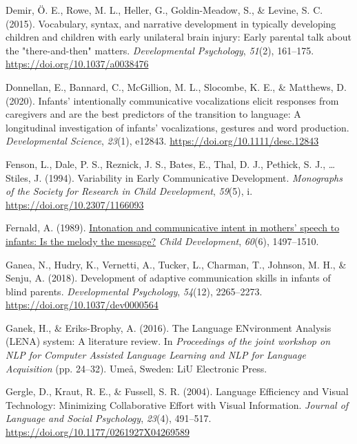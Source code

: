 \documentclass[
  man,floatsintext]{apa6}
\newlength{\cslhangindent}
\newlength{\cslentryspacingunit} %
\newenvironment{CSLReferences}[2] %
 {%
  \setlength{\parindent}{0pt}
  \ifodd #1
  \let\oldpar\par
  \def\par{\hangindent=\cslhangindent\oldpar}
  \fi
  \setlength{\parskip}{#2\cslentryspacingunit}
 }%
 {}
\begin{document}
\begin{CSLReferences}{1}{0}
\leavevmode{}%
Demir, Ö. E., Rowe, M. L., Heller, G., Goldin-Meadow, S., \& Levine, S. C. (2015). Vocabulary, syntax, and narrative development in typically developing children and children with early unilateral brain injury: Early parental talk about the "there-and-then" matters. \emph{Developmental Psychology}, \emph{51}(2), 161--175. \url{https://doi.org/10.1037/a0038476}

\leavevmode{}%
Donnellan, E., Bannard, C., McGillion, M. L., Slocombe, K. E., \& Matthews, D. (2020). Infants' intentionally communicative vocalizations elicit responses from caregivers and are the best predictors of the transition to language: {A} longitudinal investigation of infants' vocalizations, gestures and word production. \emph{Developmental Science}, \emph{23}(1), e12843. \url{https://doi.org/10.1111/desc.12843}

\leavevmode{}%
Fenson, L., Dale, P. S., Reznick, J. S., Bates, E., Thal, D. J., Pethick, S. J., \ldots{} Stiles, J. (1994). Variability in {Early Communicative Development}. \emph{Monographs of the Society for Research in Child Development}, \emph{59}(5), i. \url{https://doi.org/10.2307/1166093}

\leavevmode{}%
Fernald, A. (1989). \href{https://www.ncbi.nlm.nih.gov/pubmed/2612255}{Intonation and communicative intent in mothers' speech to infants: Is the melody the message?} \emph{Child Development}, \emph{60}(6), 1497--1510.

\leavevmode{}%
Ganea, N., Hudry, K., Vernetti, A., Tucker, L., Charman, T., Johnson, M. H., \& Senju, A. (2018). Development of adaptive communication skills in infants of blind parents. \emph{Developmental Psychology}, \emph{54}(12), 2265--2273. \url{https://doi.org/10.1037/dev0000564}

\leavevmode{}%
Ganek, H., \& Eriks-Brophy, A. (2016). The {Language ENvironment Analysis} ({LENA}) system: {A} literature review. In \emph{Proceedings of the joint workshop on {NLP} for {Computer Assisted Language Learning} and {NLP} for {Language Acquisition}} (pp. 24--32). {Umeå, Sweden}: {LiU Electronic Press}.

\leavevmode{}%
Gergle, D., Kraut, R. E., \& Fussell, S. R. (2004). Language {Efficiency} and {Visual Technology}: {Minimizing Collaborative Effort} with {Visual Information}. \emph{Journal of Language and Social Psychology}, \emph{23}(4), 491--517. \url{https://doi.org/10.1177/0261927X04269589}


\end{CSLReferences}
\end{document}
